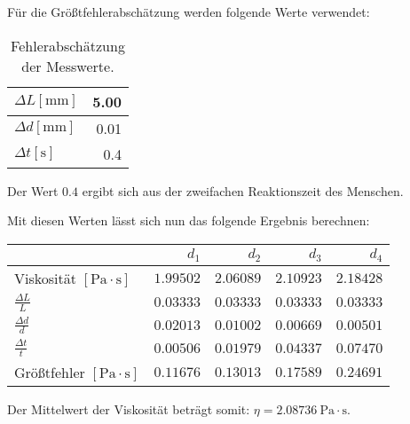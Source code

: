             Für die Größtfehlerabschätzung werden folgende Werte verwendet:

            \begin{table}[H]
                \centering
                \begin{tabular}{|l||r|}
                    \hline
                    $\Delta L [\mathrm{mm}]$ & 5.00\\
                    \hline
                    $\Delta d [\mathrm{mm}]$ & 0.01\\
                    \hline
                    $\Delta t [\mathrm{s}]$ & 0.4\\
                    \hline
                \end{tabular}
                \caption{Fehlerabschätzung der Messwerte.}
                \label{tab:Fehlerabschaetzung}
            \end{table}

            Der Wert $0.4$ ergibt sich aus der zweifachen Reaktionszeit des Menschen.

            Mit diesen Werten lässt sich nun das folgende Ergebnis berechnen:

            \begin{table}[H]
                \centering
                \begin{tabular}{|l||r|r|r|r|}
                    \hline
                    & $d_{1}$ & $d_{2}$ & $d_{3}$ & $d_{4}$\\
                    \hline \hline
                    Viskosität $[\mathrm{Pa \cdot s}]$ & $1.99502$ & $2.06089$ & $2.10923$ & $2.18428$\\
                    \hline
                    $\frac{\Delta L}{L}$ & $0.03333$ & $0.03333$ & $0.03333$ & $0.03333$\\
                    $\frac{\Delta d}{d}$ & $0.02013$ & $0.01002$ & $0.00669$ & $0.00501$\\
                    $\frac{\Delta t}{t}$ & $0.00506$ & $0.01979$ & $0.04337$ & $0.07470$\\
                    \hline
                    Größtfehler $[\mathrm{Pa \cdot s}]$ & $0.11676$ & $0.13013$ & $0.17589$ & $0.24691$\\
                    \hline
                \end{tabular}
            \end{table}

            Der Mittelwert der Viskosität beträgt somit: $\eta = 2.08736\ \mathrm{Pa \cdot s}$.

